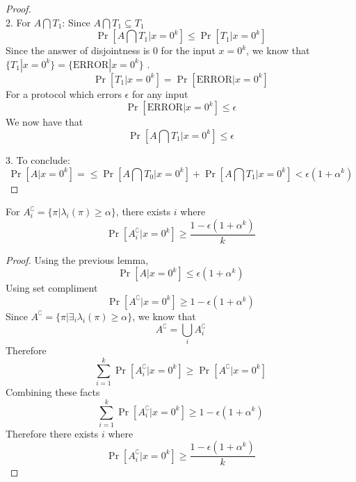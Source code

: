 \begin{proof}
\begin{equation*}
\end{equation*}
2. For $A \bigcap T_1$: \newline
Since $A \bigcap T_1 \subseteq T_1$
\begin{equation*}
    \Pr[A \bigcap T_1 | x = 0^k] \leq \Pr[T_1 | x = 0^k]
\end{equation*}
Since the answer of disjointness is 0 for the input $x=0^k$, we know that $\{T_1 | x=0^k\} = \{\text{ERROR} | x=0^k\}$ .
\begin{equation*}
    \Pr[T_1 | x = 0^k] = \Pr[\text{ERROR} | x = 0^k]
\end{equation*}
For a protocol which errors $\epsilon$ for any input
\begin{equation*}
    \Pr[\text{ERROR} | x = 0^k] \leq \epsilon
\end{equation*}
We now have that 
\begin{equation*}
    \Pr[A \bigcap T_1 | x = 0^k] \leq \epsilon
\end{equation*}

3. To conclude: \newline
\begin{equation*}
    \Pr[A| x = 0^k] = \leq \Pr[A \bigcap T_0 | x = 0^k] + \Pr[A \bigcap T_1 | x = 0^k] < \epsilon (1 + \alpha ^k)
\end{equation*}
\end{proof}

\begin{lemma}
    For $A_{i}^\complement = \{\pi | \lambda_i(\pi) \geq \alpha\}$, there exists $i$ where
    \begin{equation*}
    \Pr[A_{i}^\complement| x = 0^k] \geq \frac{1 - \epsilon (1 + \alpha ^k)}{k}
    \end{equation*}
\end{lemma}
\begin{proof}
Using the previous lemma,
\begin{equation*}
    \Pr[A| x = 0^k] \leq \epsilon (1 + \alpha ^k)
\end{equation*}
Using set compliment
\begin{equation*}
    \Pr[A^\complement| x = 0^k] \geq 1 - \epsilon (1 + \alpha ^k)
\end{equation*}
Since $A^\complement = \{\pi | \exists_i \lambda_i(\pi) \geq \alpha\}$, we know that 
\begin{equation*}
    A^\complement = \bigcup_{i} A_{i}^\complement
\end{equation*}
Therefore 
\begin{equation*}
     \sum_{i=1}^{k} \Pr[A_i^\complement| x = 0^k] \geq \Pr[A^\complement| x = 0^k]
\end{equation*}
Combining these facts
\begin{equation*}
    \sum_{i=1}^{k} \Pr[A_i^\complement| x = 0^k] \geq 1 - \epsilon (1 + \alpha ^k)
\end{equation*}
Therefore there exists $i$ where 
\begin{equation*}
    \Pr[A_{i}^\complement| x = 0^k] \geq \frac{1 - \epsilon (1 + \alpha ^k)}{k}
    \end{equation*}
\end{proof}

